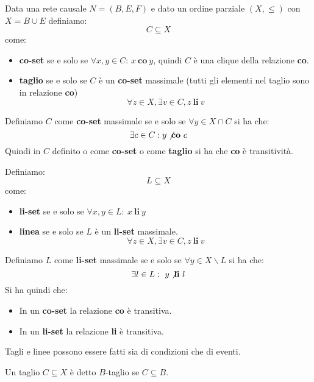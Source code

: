 \begin{definizione}
    Data una rete causale $N = (B,E, F)$ e dato un ordine parziale $(X, \leq)$
    con $X = B \cup E$ definiamo:
    \begin{equation}
        C \subseteq X
    \end{equation}
    come:
    \begin{itemize}
        \item \textbf{co-set} se e solo se $\forall x, y \in C$: $x \ \textbf{co} \ y$,
              quindi $C$ è una clique della relazione \textbf{co}.
        \item \textbf{taglio} se e solo se $C$ è un \textbf{co-set} massimale
              (tutti gli elementi nel taglio sono in relazione \textbf{co})
              \begin{equation}
                  \forall z\in X, \exists v\in C, z \ \textbf{li} \ v
              \end{equation}
    \end{itemize}
    Definiamo $C$ come \textbf{co-set} massimale se e solo se $\forall y \in X \cap C$
    si ha che:
    \begin{equation}
        \exists c \in C: y \not\textbf{co} \ c
    \end{equation}
    Quindi in $C$ definito o come \textbf{co-set} o come \textbf{taglio} si ha
    che \textbf{co} è transitività.

    Definiamo:
    \begin{equation}
        L \subseteq X
    \end{equation}
    come:
    \begin{itemize}
        \item \textbf{li-set} se e solo se $\forall x, y \in L: \ x \ \textbf{li} \ y$
        \item \textbf{linea} se e solo se $L$ è un \textbf{li-set} massimale.
              \begin{equation}
                  \forall z\in X, \exists v\in C, z \ \textbf{li} \ v
              \end{equation}
    \end{itemize}
    Definiamo $L$ come \textbf{li-set} massimale se e solo se $\forall y \in X
        \backslash L$ si ha che:
    \begin{equation}
        \exists l \in L: \ y \not\textbf{li}  \ l
    \end{equation}
    Si ha quindi che:
    \begin{itemize}
        \item In un \textbf{co-set} la relazione \textbf{co} è transitiva.
        \item In un \textbf{li-set} la relazione \textbf{li} è transitiva.
    \end{itemize}
    Tagli e linee possono essere fatti sia di condizioni che di eventi.
\end{definizione}
Un taglio $C \subseteq X$ è detto $B$-taglio se $C \subseteq B$.

